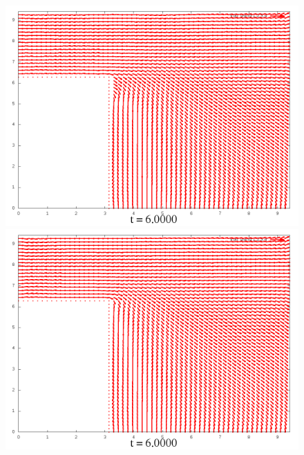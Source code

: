 \documentclass[a4paper, 12pt]{article}
\begin{document}
\begin{figure}[h]
	\begin{minipage}[h]{0.4\linewidth}
		\includegraphics[width=1\linewidth]{./img/01_1_1/V/30}
	\end{minipage}
	\hfill
	\begin{minipage}[h]{0.4\linewidth}
		\includegraphics[width=1\linewidth]{./img/01_1_01/V/30}
	\end{minipage}
\end{figure}
\end{document}
